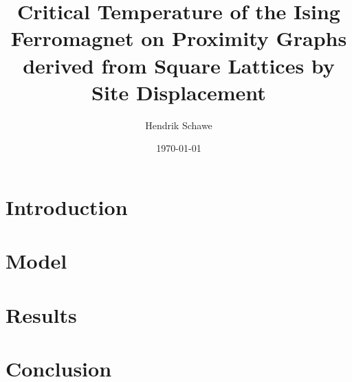 \documentclass[prl,twocolumn,groupedaddress,showpacs,showkeys,amsmath,amssymb,floatfix]{revtex4-1}
\begin{document}
    \title{Critical Temperature of the Ising Ferromagnet on Proximity Graphs derived from Square Lattices by Site Displacement}
    \author{Hendrik Schawe}
    \date{\today}

    \begin{abstract}
    
    \end{abstract}

    \maketitle

    \section{Introduction}
        

    \section{Model}
        

    \section{Results}
        

    \section{Conclusion}
        

    

    
\end{document}
